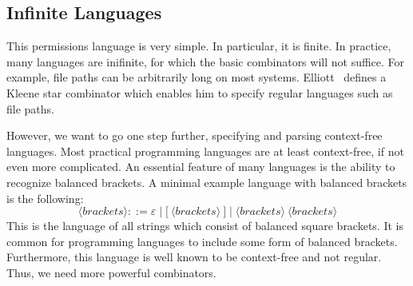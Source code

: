 \subsection{Infinite Languages}

This permissions language is very simple. In particular, it is finite. In practice, many languages are inifinite, for which the basic combinators will not suffice. For example, file paths can be arbitrarily long on most systems.
Elliott~\cite{conal-languages} defines a Kleene star combinator which enables him to specify regular languages such as file paths.

However, we want to go one step further, specifying and parsing context-free
languages. Most practical programming languages are at least context-free, if
not even more complicated. An essential feature of many languages is the ability
to recognize balanced brackets. A minimal example language with balanced
brackets is the following:
%
\begin{equation*}
\langle\textit{brackets}\rangle ::= ε \mid \textrm{[}~\langle\textit{brackets}\rangle~\textrm{]} \mid \langle\textit{brackets}\rangle~\langle\textit{brackets}\rangle
\end{equation*}
%
This is the language of all strings which consist of balanced square brackets. 
It is common for programming languages to include some form of balanced
brackets. Furthermore, this language is well known to be context-free and not
regular. Thus, we need more powerful combinators.

